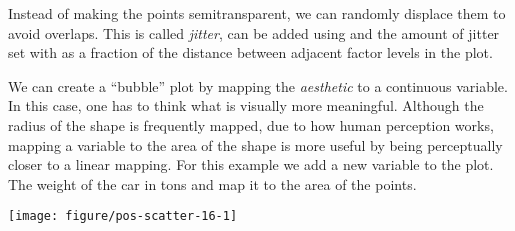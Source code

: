 \documentclass[krantz2]{krantz}\usepackage{knitr}%
\begin{document}
Instead of making the points semitransparent, we can randomly displace them to avoid overlaps. This is called \emph{jitter}, can be added using  and the amount of jitter set with  as a fraction of the distance between adjacent factor levels in the plot.
\begin{knitrout}\footnotesize
{}\color{fgcolor}\begin{kframe}
\begin{alltt}
\hlstd{(}  \hlstd{(} \hlstd{=}    \hlopt{+}
  \hlstd{(} \hlstd{=} \hlstd{(} \hlstd{=} \hlstd{))}
\end{alltt}
\end{kframe}
\end{knitrout}

We can create a ``bubble'' plot by mapping the  \emph{aesthetic} to a continuous variable. In this case, one has to think what is visually more meaningful. Although the radius of the shape is frequently mapped, due to how human perception works, mapping a variable to the area of the shape is more useful by being perceptually closer to a linear mapping. For this example we add a new variable to the plot. The weight of the car in tons and map it to the area of the points.

\begin{knitrout}\footnotesize
{}\color{fgcolor}\begin{kframe}
\begin{alltt}
\hlstd{(}  \hlstd{(}   
                           \hlstd{=} 
                            \hlopt{+}
  \hlstd{()} \hlopt{+}
  \hlstd{()}
\end{alltt}
\end{kframe}

{\centering \texttt{[image: figure/pos-scatter-16-1]} 

}



\end{knitrout}
\end{document}

